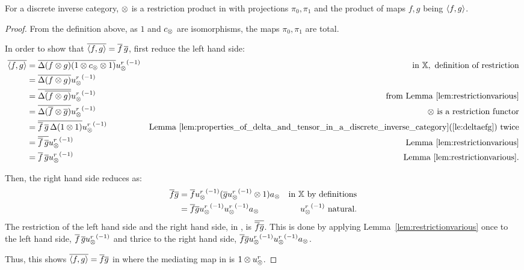 \begin{lemma}\label{lem:tensor_on_x_is_the_restriction_product_on_xt}
  For \X a discrete inverse category, $\otimes$ is a restriction product in \Xt with projections $\pi_0,
  \pi_1$ and the product of maps  $f, g$ being $\langle f,g\rangle$.
\end{lemma}
\begin{proof}
  From the definition above, as $1$ and $c_{\otimes}$ are isomorphisms, the maps $\pi_0, \pi_1$ are
  total.

  In order to show that $\overline{\langle f,g\rangle} = \overline{f}\,\overline{g}$, first reduce the left hand side:
  \begin{align*}
    \overline{\langle f,g\rangle}
      &=\overline{\Delta(f\otimes g)(1\otimes c_{\otimes}\otimes1)}{u_{\otimes}^r}^{(-1)}&\text{in }\mathbb{X}, \text{ definition of restriction}\\
    &=\overline{\Delta(f\otimes g)}{u_{\otimes}^r}^{(-1)} &\\
    &=\overline{\Delta\overline{(f\otimes g)}}{u_{\otimes}^r}^{(-1)} &\text{from Lemma \ref{lem:restrictionvarious}}\\
    &=\overline{\Delta(\overline{f}\otimes\overline{g})}{u_{\otimes}^r}^{(-1)} &\otimes\text{ is a restriction functor}\\
    &=\overline{\overline{f}\,\overline{g}\,\Delta(1\otimes1)}{u_{\otimes}^r}^{(-1)}
      &\text{Lemma  \ref{lem:properties_of_delta_and_tensor_in_a_discrete_inverse_category}(\ref{le:deltaefg}) twice}\\
    &=\overline{\overline{f}\,\overline{g}}{u_{\otimes}^r}^{(-1)} &\text{Lemma  \ref{lem:restrictionvarious}}\\
    &=\overline{f}\,\overline{g}{u_{\otimes}^r}^{(-1)}  &\text{Lemma  \ref{lem:restrictionvarious}.}\\
  \end{align*}

  Then, the right hand side reduces as:
  \begin{align*}
    \rst{f} \rst{g}
    &= \rst{f}\inv{\usr}(\rst{g}\inv{\usr} \* 1) a_{\*} & \text{in \X by definitions}\\
    &= \rst{f} \rst{g}\inv{\usr}\inv{\usr} a_{\*} &  \inv{\usr}\text{ natural.}
  \end{align*}
  The restriction of the left hand side and the right hand side, in \X, is $\overline{\overline{f} \overline{g}}$.
  This is done by applying Lemma~\ref{lem:restrictionvarious} once to the left hand side,
  $\overline{f}\,\overline{g}{u_{\otimes}^r}^{(-1)}$ and thrice to the right hand side,
  $\overline{f} \overline{g}{u_{\otimes}^r}^{(-1)}{u_{\otimes}^r}^{(-1)} a_{\otimes}$.

  Thus, this shows $\overline{\langle f,g\rangle}=\overline{f} \overline{g}$ in \Xt where the mediating map in \X is
  $1\otimes u_{\otimes}^r$.


\end{proof}
